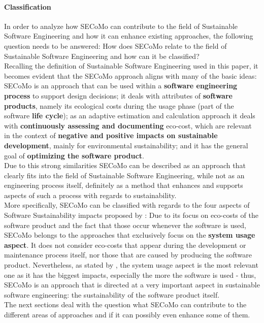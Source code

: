 \documentclass[oribibl]{llncs}
\begin{document}
\paragraph{Classification}
In order to analyze how SECoMo can contribute to the field of Sustainable Software Engineering and how it can enhance existing approaches, the following question needs to be answered: How does SECoMo relate to the field of Sustainable Software Engineering and how can it be classified?\\
Recalling the definition of Sustainable Software Engineering %
used in this paper, it becomes evident that the SECoMo approach aligns with many of the basic ideas: SECoMo is an approach that can be used within a \textbf{software engineering process} to support design decisions; it deals with attributes of \textbf{software products}, namely its ecological costs during the usage phase (part of the software \textbf{life cycle}); as an adaptive estimation and calculation approach it deals with \textbf{continuously assessing and documenting} eco-cost, which are relevant in the context of \textbf{negative and positive impacts on sustainable development}, mainly for environmental sustainability; and it has the general goal of \textbf{optimizing the software product}.\\
Due to this strong similarities SECoMo can be described as an approach that clearly fits into the field of Sustainable Software Engineering, while not as an engineering process itself, definitely as a method that enhances and supports aspects of such a process with regards to sustainability.\\
More specifically, SECoMo can be classified with regards to the four aspects of Software Sustainability impacts proposed by \cite{penzenstadler_supporting_2012}: Due to its focus on eco-costs of the software product and the fact that those occur whenever the software is used, SECoMo belongs to the approaches that exclusively focus on the \textbf{system usage aspect}. It does not consider eco-costs that appear during the development or maintenance process itself, nor those that are caused by producing the software product. Nevertheless, as stated by \cite{penzenstadler_what_13}, the system usage aspect is the most relevant one as it has the biggest impacts, especially the more the software is used - thus, SECoMo is an approach that is directed at a very important aspect in sustainable software engineering: the sustainability of the software product itself.\\
The next sections deal with the question what SECoMo can contribute to the different areas of approaches and if it can possibly even enhance some of them.
\end{document}
